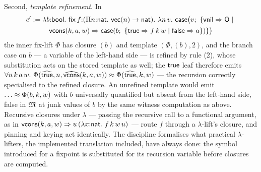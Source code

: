 \begin{remark}
Second, \emph{template refinement}.  In
\begin{multline*}
  c' \mathrel{:=} \lambda b{:}\mathsf{bool}.\ \mathsf{fix}\,f{:}(\Pi n{:}\mathsf{nat}.\ \mathsf{vec}(n)
  \to \mathsf{nat}).\ \lambda n\,v.\ \mathsf{case}\bigl(v;\ \{\mathsf{vnil}
  \Rightarrow \mathsf{O} \mid {}\\
  \mathsf{vcons}(k,a,w) \Rightarrow \mathsf{case}(b;\
  \{\mathsf{true} \Rightarrow f\,k\,w \mid \mathsf{false} \Rightarrow a\})\}\bigr)
\end{multline*}
the inner fix-lift $\Phi$ has closure $(b)$ and template $(\Phi, (b),
2)$, and the branch case on $b$ --- a variable of the left-hand side
--- is refined by rule (2), whose substitution acts on the stored
template as well; the $\mathsf{true}$ leaf therefore emits $\forall
n\,k\,a\,w.\ \Phi(\widehat{\mathsf{true}}, n, \widehat{\mathsf{vcons}}(k,a,w)) \approx
\Phi(\widehat{\mathsf{true}}, k, w)$ --- the recursion correctly specialised to
the refined closure.  An unrefined template would emit $\dots \feq
\Phi(b, k, w)$ with $b$ universally quantified but absent from the
left-hand side, false in $\mathfrak{M}$ at junk values of $b$ by the same
witness computation as above.  Recursive closures under $\lambda$ ---
passing the recursive call to a functional argument, as in
$\csvcons(k,a,w) \Rightarrow u\,(\lambda x{:}\nat.\ f\,k\,w\,u)$ ---
route $f$ through a $\lambda$-lift's closure, and pinning and keying
act identically.  The discipline formalises what practical
$\lambda$-lifters, the implemented translation included, have always
done: the symbol introduced for a fixpoint is substituted for its
recursion variable before closures are computed.
\end{remark}

